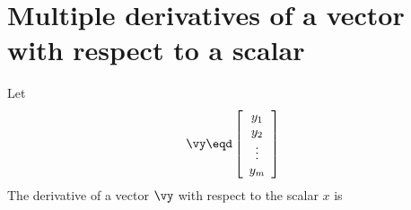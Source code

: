 \section{Multiple derivatives of a vector with respect to a scalar}
\begin{definition}
Let
\[
   \vy \eqd
   \left[\begin{array}{c}
     y_1    \\
     y_2    \\
     \vdots \\
     y_m
   \end{array}\right]
\]
The derivative of a vector $\vy$ with respect to the scalar $x$ is
\end{definition}

